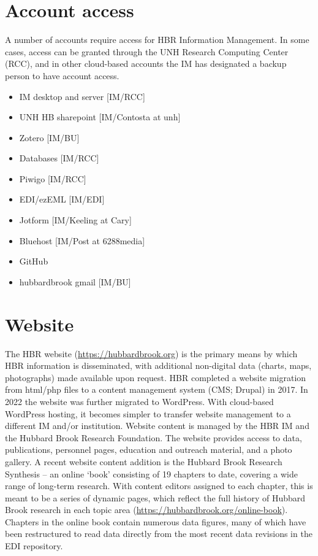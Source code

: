 \documentclass[
  letterpaper,
  DIV=11,
  numbers=noendperiod]{scrreprt}
\providecommand{\tightlist}{%
  \setlength{\itemsep}{0pt}\setlength{\parskip}{0pt}}\usepackage{longtable,booktabs,array}
\begin{document}
\section{Account access}\label{account-access}

A number of accounts require access for HBR Information Management. In
some cases, access can be granted through the UNH Research Computing
Center (RCC), and in other cloud-based accounts the IM has designated a
backup person to have account access.

\begin{itemize}
\tightlist
\item
  IM desktop and server {[}IM/RCC{]}
\item
  UNH HB sharepoint {[}IM/Contosta at unh{]}
\item
  Zotero {[}IM/BU{]}
\item
  Databases {[}IM/RCC{]}
\item
  Piwigo {[}IM/RCC{]}
\item
  EDI/ezEML {[}IM/EDI{]}
\item
  Jotform {[}IM/Keeling at Cary{]}
\item
  Bluehost {[}IM/Post at 6288media{]}
\item
  GitHub
\item
  hubbardbrook gmail {[}IM/BU{]}
\end{itemize}

\section{Website}\label{website}

The HBR website
(\href{https://hubbardbrook.org/}{https://hubbardbrook.org}) is the
primary means by which HBR information is disseminated, with additional
non-digital data (charts, maps, photographs) made available upon
request. HBR completed a website migration from html/php files to a
content management system (CMS; Drupal) in 2017. In 2022 the website was
further migrated to WordPress. With cloud-based WordPress hosting, it
becomes simpler to transfer website management to a different IM and/or
institution. Website content is managed by the HBR IM and the Hubbard
Brook Research Foundation. The website provides access to data,
publications, personnel pages, education and outreach material, and a
photo gallery. A recent website content addition is the Hubbard Brook
Research Synthesis -- an online `book' consisting of 19 chapters to
date, covering a wide range of long-term research. With content editors
assigned to each chapter, this is meant to be a series of dynamic pages,
which reflect the full history of Hubbard Brook research in each topic
area (\url{https://hubbardbrook.org/online-book}). Chapters in the
online book contain numerous data figures, many of which have been
restructured to read data directly from the most recent data revisions
in the EDI repository.
\end{document}
